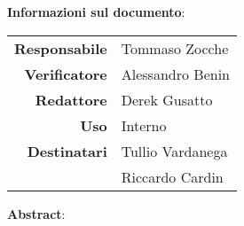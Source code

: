 \begin{center}
\textbf{Informazioni sul documento}: \\
\vspace{0.5cm}

\begin{tabular}{r|l}
    \textbf{Responsabile} & Tommaso Zocche \\ 
    \textbf{Verificatore} & Alessandro Benin \\ 
    \textbf{Redattore} &  Derek Gusatto \\ 
    \textbf{Uso} & Interno \\ 
    \textbf{Destinatari} & Tullio Vardanega \\ & Riccardo Cardin \\ 
\end{tabular}

\vfill

\textbf{Abstract}: \\
\vspace{0.5cm}

\end{center}


\bigskip